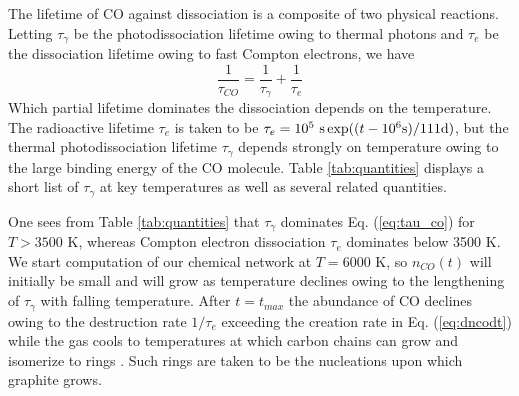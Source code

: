\documentclass[manuscript]{aastex}
\begin{document}
The lifetime of CO against dissociation is a composite of two physical
reactions. Letting $\tau_\gamma$ be the photodissociation lifetime owing
to thermal photons and $\tau_e$ be the dissociation lifetime owing to fast
Compton electrons, we have
\begin{equation}
\frac{1}{\tau_{CO}} = \frac{1}{\tau_\gamma} + \frac{1}{\tau_e}
\label{eq:tau_co}
\end{equation}
Which partial lifetime dominates the dissociation depends on the temperature.
The radioactive lifetime $\tau_e$ is taken to be
$\tau_e = 10^5\ {\rm s} \exp( ( t -10^6{\rm s}) / 111 {\rm d} )$,
but the thermal photodissociation lifetime $\tau_\gamma$
depends strongly on temperature
owing to the large binding energy of the CO molecule.
Table \ref{tab:quantities} displays a
short list of $\tau_\gamma$ at key temperatures as well as several related
quantities.

One sees from Table \ref{tab:quantities}
that $\tau_\gamma$ dominates Eq. (\ref{eq:tau_co}) for $T > 3500$ K,
whereas Compton
electron dissociation $\tau_e$
dominates below 3500 K. We start computation of our
chemical network at $T = 6000$ K,
so $n_{CO}(t)$ will initially be small and will
grow as temperature declines owing to the lengthening of $\tau_\gamma$ with
falling temperature. After $t=t_{max}$ the abundance of CO declines owing to
the destruction rate $1/\tau_e$ exceeding the creation rate in
Eq. (\ref{eq:dncodt})
while the gas cools to temperatures at which carbon chains can grow and
isomerize to rings \citep{1999Sci...283.1290C}. Such rings are taken to be
the nucleations upon which graphite grows.
\end{document}
